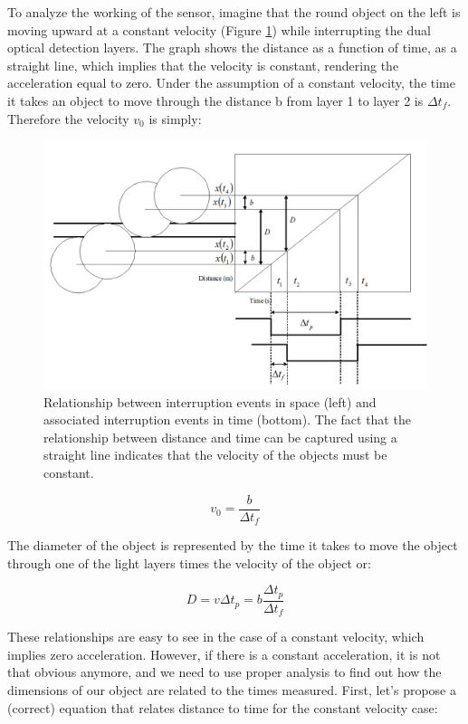\documentclass[11pt,letterpaper]{article}
\begin{document}
To analyze the working of the sensor, imagine that the round object on the left is moving upward at a constant velocity (Figure \ref{fig:HW_TimeOfFlightMeasurement2}) while interrupting the dual optical detection layers. The graph shows the distance as a function of time, as a straight line, which implies that the velocity is constant, rendering the acceleration equal to zero. Under the assumption of a constant velocity, the time it takes an object to move through the distance b from layer 1 to layer 2 is $\Delta t_f$. Therefore the velocity $v_0$ is simply:

\begin{figure}
\centering
\includegraphics[width=0.9\linewidth]{HW_TimeOfFlightMeasurement2}
\caption{Relationship between interruption events in space (left) and associated interruption events in time (bottom). The fact that the relationship between distance and time can be captured using a straight line indicates that the velocity of the objects must be constant.}
\label{fig:HW_TimeOfFlightMeasurement2}
\end{figure}

\begin{equation} \label{Eqn:HW_TimeOfFlightMeasurement1}
v_0 = \dfrac{b}{\Delta t_f}
\end{equation}

The diameter of the object is represented by the time it takes to move the object through one of the light layers times the velocity of the object or:

\begin{equation} \label{Eqn:HW_TimeOfFlightMeasurement2}
D = v \Delta t_p = b \dfrac{\Delta t_p}{\Delta t_f}
\end{equation}

These relationships are easy to see in the case of a constant velocity, which implies zero acceleration. However, if there is a constant acceleration, it is not that obvious anymore, and we need to use proper analysis to find out how the dimensions of our object are related to the times measured. First, let's propose a (correct) equation that relates distance to time for the constant velocity case:
\end{document}
